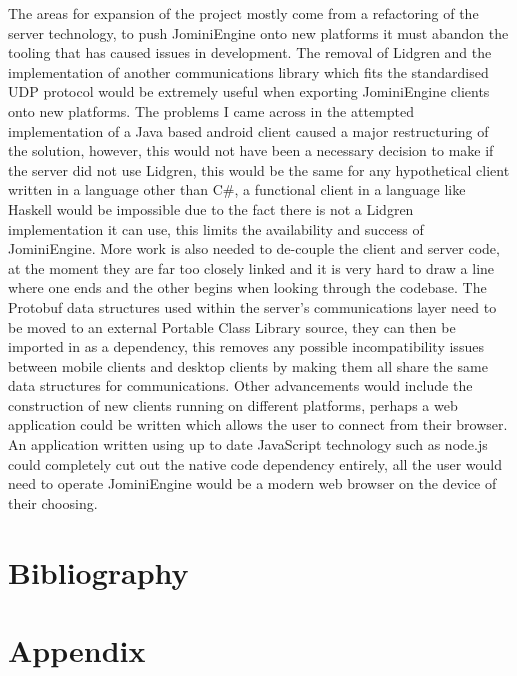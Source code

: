 \documentclass{article}
\begin{document}
The areas for expansion of the project mostly come from a refactoring of the server technology, to push JominiEngine onto new platforms it must abandon the tooling that has caused issues in development. The removal of Lidgren and the implementation of another communications library which fits the standardised UDP protocol would be extremely useful when exporting JominiEngine clients onto new platforms. The problems I came across in the attempted implementation of a Java based android client caused a major restructuring of the solution, however, this would not have been a necessary decision to make if the server did not use Lidgren, this would be the same for any hypothetical client written in a language other than C\#, a functional client in a language like Haskell would be impossible due to the fact there is not a Lidgren implementation it can use, this limits the availability and success of JominiEngine. 
More work is also needed to de-couple the client and server code, at the moment they are far too closely linked and it is very hard to draw a line where one ends and the other begins when looking through the codebase. The Protobuf data structures used within the server’s communications layer need to be moved to an external Portable Class Library source, they can then be imported in as a dependency, this removes any possible incompatibility issues between mobile clients and desktop clients by making them all share the same data structures for communications.
Other advancements would include the construction of new clients running on different platforms, perhaps a web application could be written which allows the user to connect from their browser. An application written using up to date JavaScript technology such as node.js could completely cut out the native code dependency entirely, all the user would need to operate JominiEngine would be a modern web browser on the device of their choosing.
	\newpage
	\section{Bibliography}
	\printbibliography
	\newpage
	\section{Appendix}
\end{document}
